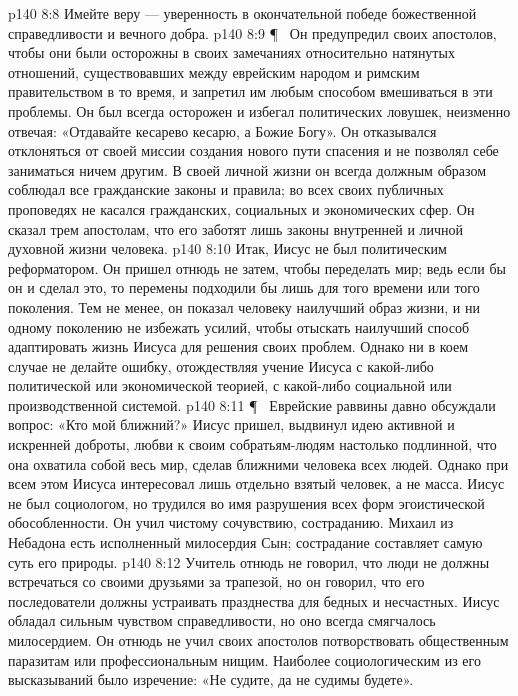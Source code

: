 \vs p140 8:8 Имейте веру --- уверенность в окончательной победе божественной справедливости и вечного добра.
\vs p140 8:9 \P\ \bibnobreakspace {} Он предупредил своих апостолов, чтобы они были осторожны в своих замечаниях относительно натянутых отношений, существовавших между еврейским народом и римским правительством в то время, и запретил им любым способом вмешиваться в эти проблемы. Он был всегда осторожен и избегал политических ловушек, неизменно отвечая: «Отдавайте кесарево кесарю, а Божие Богу». Он отказывался отклоняться от своей миссии создания нового пути спасения и не позволял себе заниматься ничем другим. В своей личной жизни он всегда должным образом соблюдал все гражданские законы и правила; во всех своих публичных проповедях не касался гражданских, социальных и экономических сфер. Он сказал трем апостолам, что его заботят лишь законы внутренней и личной духовной жизни человека.
\vs p140 8:10 Итак, Иисус не был политическим реформатором. Он пришел отнюдь не затем, чтобы переделать мир; ведь если бы он и сделал это, то перемены подходили бы лишь для того времени или того поколения. Тем не менее, он показал человеку наилучший образ жизни, и ни одному поколению не избежать усилий, чтобы отыскать наилучший способ адаптировать жизнь Иисуса для решения своих проблем. Однако ни в коем случае не делайте ошибку, отождествляя учение Иисуса с какой\hyp{}либо политической или экономической теорией, с какой\hyp{}либо социальной или производственной системой.
\vs p140 8:11 \P\ \bibnobreakspace {}  Еврейские раввины давно обсуждали вопрос: «Кто мой ближний?» Иисус пришел, выдвинул идею активной и искренней доброты, любви к своим собратьям\hyp{}людям настолько подлинной, что она охватила собой весь мир, сделав ближними человека всех людей. Однако при всем этом Иисуса интересовал лишь отдельно взятый человек, а не масса. Иисус не был социологом, но трудился во имя разрушения всех форм эгоистической обособленности. Он учил чистому сочувствию, состраданию. Михаил из Небадона есть исполненный милосердия Сын; сострадание составляет самую суть его природы.
\vs p140 8:12 Учитель отнюдь не говорил, что люди не должны встречаться со своими друзьями за трапезой, но он говорил, что его последователи должны устраивать празднества для бедных и несчастных. Иисус обладал сильным чувством справедливости, но оно всегда смягчалось милосердием. Он отнюдь не учил своих апостолов потворствовать общественным паразитам или профессиональным нищим. Наиболее социологическим из его высказываний было изречение: «Не судите, да не судимы будете».
